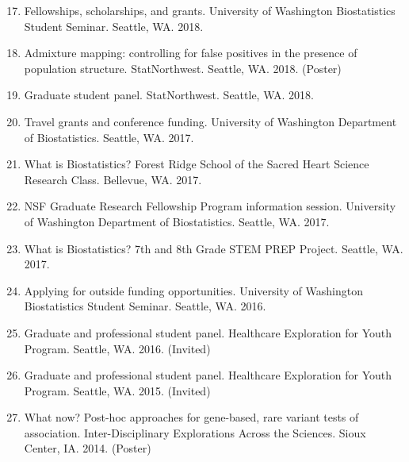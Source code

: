 \documentclass[margin]{res}
\newenvironment{benumerate}[1]{
    \let\oldItem\item
    \def\item{\addtocounter{enumi}{-2}\oldItem}
    
    \begin{enumerate}
    \setcounter{enumi}{#1}
    \addtocounter{enumi}{1}
}{
    \end{enumerate}
}
\begin{document}
\begin{resume}
\begin{benumerate}{16}
\item Fellowships, scholarships, and grants. University of Washington Biostatistics Student Seminar. Seattle, WA. 2018.

\item %
Admixture mapping: controlling for false positives in the presence of population structure. StatNorthwest. Seattle, WA. 2018. (Poster)

\item Graduate student panel. StatNorthwest. Seattle, WA. 2018.

\item %
Travel grants and conference funding. University of Washington Department of Biostatistics. Seattle, WA. 2017.

\item %
What is Biostatistics? Forest Ridge School of the Sacred Heart Science Research Class. Bellevue, WA. 2017.

\item %
NSF Graduate Research Fellowship Program information session. University of Washington Department of Biostatistics. Seattle, WA. 2017.

\item %
What is Biostatistics? 7th and 8th Grade STEM PREP Project. Seattle, WA. 2017. %

\item %
Applying for outside funding opportunities. University of Washington Biostatistics Student Seminar. Seattle, WA. 2016.

\item Graduate and professional student panel. Healthcare Exploration for Youth Program. Seattle, WA. 2016. (Invited)

\item Graduate and professional student panel. Healthcare Exploration for Youth Program. Seattle, WA. 2015. (Invited)

\item %
What now? Post-hoc approaches for gene-based, rare variant tests of association. Inter-Disciplinary Explorations Across the Sciences. Sioux Center, IA. 2014.  (Poster)\\
\end{benumerate}



\end{resume}
\end{document}
